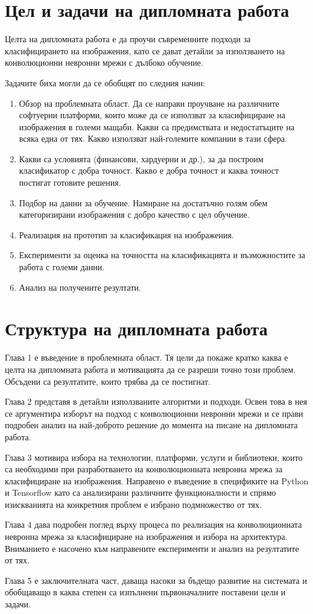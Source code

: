 \section{Цел и задачи на дипломната работа}
Целта на дипломната работа е да проучи съвременните подходи за класифицирането на изображения, като се дават детайли за използването на конволюционни невронни мрежи с дълбоко обучение.

Задачите биха могли да се обобщят по следния начин:
\begin{enumerate}
\item Обзор на проблемната област. Да се направи проучване на различните софтуерни платформи, които може да се използват за класифициране на изображения в големи мащаби. Какви са предимствата и недостатъците на всяка една от тях. Какво използват най-големите компании в тази сфера.
\item Какви са условията (финансови, хардуерни и др.), за да построим класификатор с добра точност. Какво е добра точност и каква точност постигат готовите решения.
\item Подбор на данни за обучение. Намиране на достатъчно голям обем категоризирани изображения с добро качество с цел обучение.
\item Реализация на прототип за класификация на изображения.
\item Експерименти за оценка на точността на класификацията и възможностите за работа с големи данни.
\item Анализ на получените резултати.
\end{enumerate}

\section{Структура на дипломната работа}

Глава 1 е въведение в проблемната област. Тя цели да покаже кратко каква е целта на дипломната работа и мотивацията да се разреши точно този проблем. Обсъдени са резултатите, които трябва да се постигнат.

Глава 2 представя в детайли използваните алгоритми и подходи. Освен това в нея се аргументира изборът на подход с конволюционни невронни мрежи и се прави подробен анализ на най-доброто решение до момента на писане на дипломната работа.

Глава 3 мотивира избора на технологии, платформи, услуги и библиотеки, които са необходими при разработването на конволюционната невронна мрежа за класифициране на изображения. Направено е въведение в спецификите на Python и Tensorflow като са анализирани различните функционалности и спрямо изискванията на конкретния проблем е избрано подмножество от тях.

Глава 4 дава подробен поглед върху процеса по реализация на конволюционната невронна мрежа за класифициране на изображения и избора на архитектура. Вниманието е насочено към направените експерименти и анализ на резултатите от тях.

Глава 5 е заключителната част, даваща насоки за бъдещо развитие на системата и обобщаващо в каква степен са изпълнени първоначалните поставени цели и задачи. 
